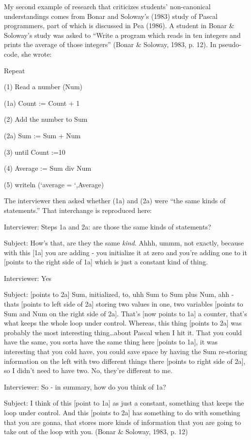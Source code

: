 My second example of research that criticizes students' non-canonical
understandings comes from Bonar and Soloway's (1983) study of Pascal
programmers, part of which is discussed in Pea (1986). A student in
Bonar \& Soloway's study was asked to ``Write a program which reads in
ten integers and prints the average of those integers'' (Bonar \&
Soloway, 1983, p. 12). In pseudo-code, she wrote:

Repeat

(1) Read a number (Num)

(1a) Count := Count + 1

(2) Add the number to Sum

(2a) Sum := Sum + Num

(3) until Count :=10

(4) Average := Sum div Num

(5) writeln (`average = `,Average)

The interviewer then asked whether (1a) and (2a) were ``the same kinds
of statements.'' That interchange is reproduced here:

Interviewer: Steps 1a and 2a: are those the same kinds of statements?

Subject: How's that, are they the same \emph{kind}. Ahhh, ummm, not
exactly, because with this {[}1a{]} you are adding - you initialize it
at zero and you're adding one to it {[}points to the right side of 1a{]}
which is just a constant kind of thing.

Interviewer: Yes

Subject: {[}points to 2a{]} Sum, initialized, to, uhh Sum to Sum plus
Num, ahh - thats {[}points to left side of 2a{]} storing two values in
one, two variables {[}points to Sum and Num on the right side of 2a{]}.
That's {[}now points to 1a{]} a counter, that's what keeps the whole
loop under control. Whereas, this thing {[}points to 2a{]} was probably
the most interesting thing\ldots{}about Pascal when I hit it. That you
could have the same, you sorta have the same thing here {[}points to
1a{]}, it was interesting that you cold have, you could save space by
having the Sum re-storing information on the left with two different
things there {[}points to right side of 2a{]}, so I didn't need to have
two. No, they're different to me.

Interviewer: So - in summary, how do you think of 1a?

Subject: I think of this {[}point to 1a{]} as just a constant, something
that keeps the loop under control. And this {[}points to 2a{]} has
something to do with something that you are gonna, that stores more
kinds of information that you are going to take out of the loop with
you. (Bonar \& Soloway, 1983, p. 12)

